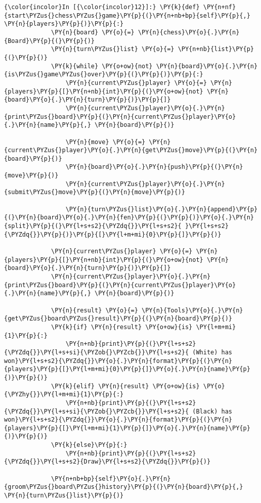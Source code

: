     \begin{Verbatim}[commandchars=\\\{\}]
{\color{incolor}In [{\color{incolor}12}]:} \PY{k}{def} \PY{n+nf}{start\PYZus{}chess\PYZus{}game}\PY{p}{(}\PY{n+nb+bp}{self}\PY{p}{,} \PY{n}{players}\PY{p}{)}\PY{p}{:}
             \PY{n}{board} \PY{o}{=} \PY{n}{chess}\PY{o}{.}\PY{n}{Board}\PY{p}{(}\PY{p}{)}
             \PY{n}{turn\PYZus{}list} \PY{o}{=} \PY{n+nb}{list}\PY{p}{(}\PY{p}{)}
             \PY{k}{while} \PY{o+ow}{not} \PY{n}{board}\PY{o}{.}\PY{n}{is\PYZus{}game\PYZus{}over}\PY{p}{(}\PY{p}{)}\PY{p}{:}
                 \PY{n}{current\PYZus{}player} \PY{o}{=} \PY{n}{players}\PY{p}{[}\PY{n+nb}{int}\PY{p}{(}\PY{o+ow}{not} \PY{n}{board}\PY{o}{.}\PY{n}{turn}\PY{p}{)}\PY{p}{]}
                 \PY{n}{current\PYZus{}player}\PY{o}{.}\PY{n}{print\PYZus{}board}\PY{p}{(}\PY{n}{current\PYZus{}player}\PY{o}{.}\PY{n}{name}\PY{p}{,} \PY{n}{board}\PY{p}{)}
         
                 \PY{n}{move} \PY{o}{=} \PY{n}{current\PYZus{}player}\PY{o}{.}\PY{n}{get\PYZus{}move}\PY{p}{(}\PY{n}{board}\PY{p}{)}
                 \PY{n}{board}\PY{o}{.}\PY{n}{push}\PY{p}{(}\PY{n}{move}\PY{p}{)}
                 \PY{n}{current\PYZus{}player}\PY{o}{.}\PY{n}{submit\PYZus{}move}\PY{p}{(}\PY{n}{move}\PY{p}{)}
         
                 \PY{n}{turn\PYZus{}list}\PY{o}{.}\PY{n}{append}\PY{p}{(}\PY{n}{board}\PY{o}{.}\PY{n}{fen}\PY{p}{(}\PY{p}{)}\PY{o}{.}\PY{n}{split}\PY{p}{(}\PY{l+s+s2}{\PYZdq{}}\PY{l+s+s2}{ }\PY{l+s+s2}{\PYZdq{}}\PY{p}{)}\PY{p}{[}\PY{l+m+mi}{0}\PY{p}{]}\PY{p}{)}
         
             \PY{n}{current\PYZus{}player} \PY{o}{=} \PY{n}{players}\PY{p}{[}\PY{n+nb}{int}\PY{p}{(}\PY{o+ow}{not} \PY{n}{board}\PY{o}{.}\PY{n}{turn}\PY{p}{)}\PY{p}{]}
             \PY{n}{current\PYZus{}player}\PY{o}{.}\PY{n}{print\PYZus{}board}\PY{p}{(}\PY{n}{current\PYZus{}player}\PY{o}{.}\PY{n}{name}\PY{p}{,} \PY{n}{board}\PY{p}{)}
         
             \PY{n}{result} \PY{o}{=} \PY{n}{Tools}\PY{o}{.}\PY{n}{get\PYZus{}board\PYZus{}result}\PY{p}{(}\PY{n}{board}\PY{p}{)}
             \PY{k}{if} \PY{n}{result} \PY{o+ow}{is} \PY{l+m+mi}{1}\PY{p}{:}
                 \PY{n+nb}{print}\PY{p}{(}\PY{l+s+s2}{\PYZdq{}}\PY{l+s+si}{\PYZob{}\PYZcb{}}\PY{l+s+s2}{ (White) has won}\PY{l+s+s2}{\PYZdq{}}\PY{o}{.}\PY{n}{format}\PY{p}{(}\PY{n}{players}\PY{p}{[}\PY{l+m+mi}{0}\PY{p}{]}\PY{o}{.}\PY{n}{name}\PY{p}{)}\PY{p}{)}
             \PY{k}{elif} \PY{n}{result} \PY{o+ow}{is} \PY{o}{\PYZhy{}}\PY{l+m+mi}{1}\PY{p}{:}
                 \PY{n+nb}{print}\PY{p}{(}\PY{l+s+s2}{\PYZdq{}}\PY{l+s+si}{\PYZob{}\PYZcb{}}\PY{l+s+s2}{ (Black) has won}\PY{l+s+s2}{\PYZdq{}}\PY{o}{.}\PY{n}{format}\PY{p}{(}\PY{n}{players}\PY{p}{[}\PY{l+m+mi}{1}\PY{p}{]}\PY{o}{.}\PY{n}{name}\PY{p}{)}\PY{p}{)}
             \PY{k}{else}\PY{p}{:}
                 \PY{n+nb}{print}\PY{p}{(}\PY{l+s+s2}{\PYZdq{}}\PY{l+s+s2}{Draw}\PY{l+s+s2}{\PYZdq{}}\PY{p}{)}
         
             \PY{n+nb+bp}{self}\PY{o}{.}\PY{n}{groom\PYZus{}board\PYZus{}history}\PY{p}{(}\PY{n}{board}\PY{p}{,} \PY{n}{turn\PYZus{}list}\PY{p}{)}
\end{Verbatim}


